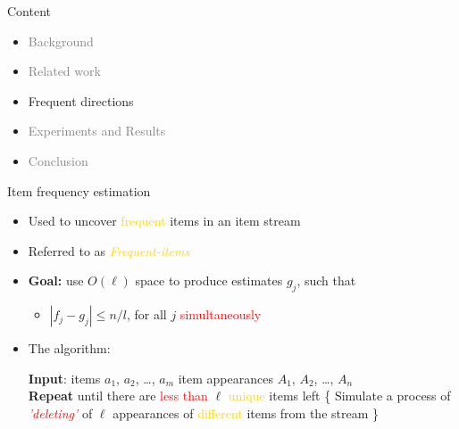 \documentclass[first=dgreen,second=purple,logo=redque]{aaltoslides}
\newcommand{\IndState}{\State\hspace{\algorithmicindent}}
\begin{document}


\begin{frame}{Content}
\begin{itemize}
\item \textcolor{gray}{Background}
\item \textcolor{gray}{Related work}
\item Frequent directions
\item \textcolor{gray}{Experiments and Results}
\item \textcolor{gray}{Conclusion}
\end{itemize}
\end{frame}

\begin{frame}[allowframebreaks=1]{Item frequency estimation}
\begin{itemize}
    \item Used to uncover \textcolor{gold}{frequent} items in an item stream 
	\item Referred to as \textcolor{gold}{\textit{Frequent-items}}
	\item \textbf{Goal:} use $O(\ell)$ space to produce estimates $g_{j}$, such
	that
	\begin{itemize}\item{$|f_{j} - g_{j} | \leq n/l$}, for all $j$
	\textcolor{red}{simultaneously}\end{itemize}

\item The algorithm:
  \begin{algorithmic}
    \State \textbf{Input}: \textcolor{dgreen}{items} $a_{1}$, $a_{2}$, \ldots,
    $a_{m}$
    \IndState \textcolor{dgreen}{item appearances} $A_{1}$, $A_{2}$, \ldots,
    $A_{n}$
    \\\State \textbf{Repeat} until there are \textcolor{red}{less than}
    $\ell$ \textcolor{gold}{unique} items left \{
     \IndState Simulate a process of
     \textcolor{red}{\textit{'deleting'}} of $\ell$ appearances of
     \IndState \textcolor{gold}{different} items from the stream
    \State \}
  \end{algorithmic}
\end{itemize}



\end{frame}
\end{document}
